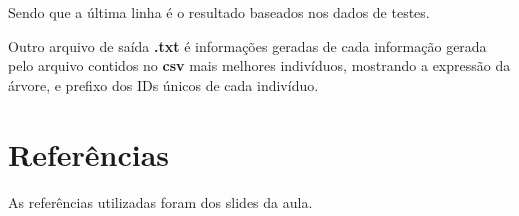 Sendo que a última linha é o resultado baseados nos dados de testes.

Outro arquivo de saída \textbf{.txt} é informações geradas de cada informação gerada pelo arquivo contidos no \textbf{csv} mais melhores indivíduos, mostrando a expressão da árvore, e prefixo dos IDs únicos de cada indivíduo.

\section{Referências}

As referências utilizadas foram dos slides da aula.
